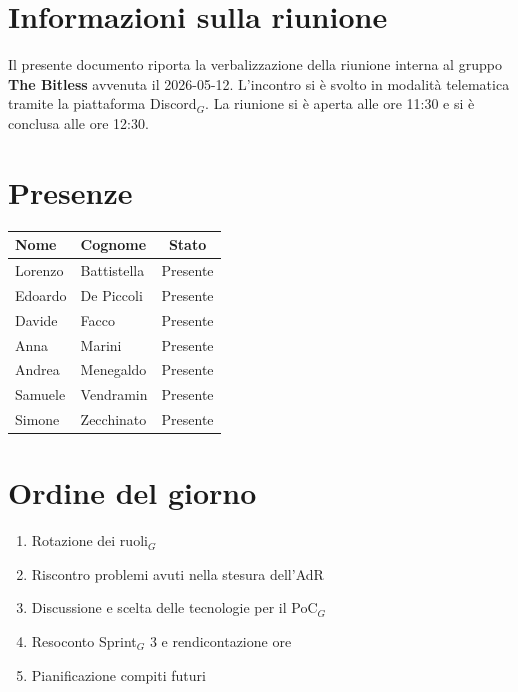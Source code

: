 \documentclass[a4paper, 10pt, colorlinks=true, linkcolor=black, urlcolor=blue, citecolor=blue, hidelinks]{article}
\begin{document}
\newcommand{\titolo}{Verbale interno}
\newcommand{\dataverbale}{2026-05-12}
\newcommand{\dataversione}{2026-05-14}
\newcommand{\versione}{1.0.0}
\newcommand{\stato}{Approvato}
\newcommand{\destinatari}{The Bitless, prof. Tullio Vardanega, prof. Riccardo Cardin}
\def\templatedir{../../../../templates}

\begin{titlepage}

\end{titlepage}

\newpage
\tableofcontents 

\newpage
{}
\section{Informazioni sulla riunione}
Il presente documento riporta la verbalizzazione della riunione interna al gruppo \textbf{The Bitless} avvenuta il \dataverbale{}. L'incontro si è svolto in modalità telematica tramite la piattaforma Discord$_G$. La riunione si è aperta alle ore 11:30 e si è conclusa alle ore 12:30.

\section{Presenze}
\begin{center}
\begin{tabular}{|l|l|c|}
\hline
\textbf{Nome} & \textbf{Cognome} & \textbf{Stato} \\
\hline
Lorenzo & Battistella & Presente \\
Edoardo & De Piccoli & Presente \\
Davide & Facco & Presente \\
Anna & Marini & Presente \\
Andrea & Menegaldo & Presente \\
Samuele & Vendramin & Presente \\
Simone & Zecchinato & Presente \\
\hline
\end{tabular}
\end{center}

\section{Ordine del giorno}
\begin{enumerate}
    \item Rotazione dei ruoli$_G$ 
    \item Riscontro problemi avuti nella stesura dell'AdR 
    \item Discussione e scelta delle tecnologie per il PoC$_G$
    \item Resoconto Sprint$_G$ 3 e rendicontazione ore
    \item Pianificazione compiti futuri
\end{enumerate}
\end{document}
